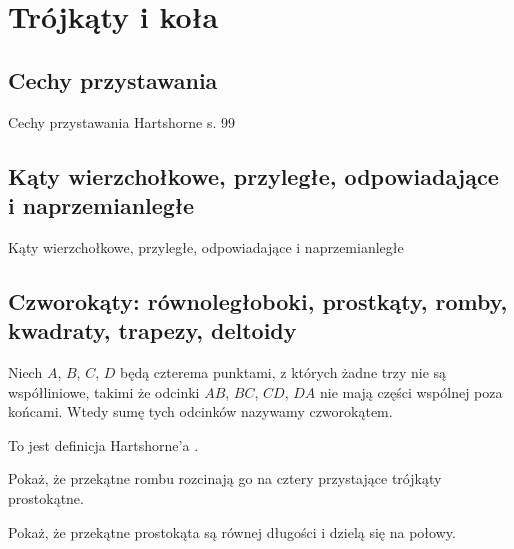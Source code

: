 \section{Trójkąty i koła}
\subsection{Cechy przystawania}
Cechy przystawania
\loremipsum
Hartshorne s. 99

\subsection{Kąty wierzchołkowe, przyległe, odpowiadające i naprzemianległe}
Kąty wierzchołkowe, przyległe, odpowiadające i naprzemianległe
\loremipsum






\subsection{Czworokąty: równoległoboki, prostkąty, romby, kwadraty, trapezy, deltoidy}

\begin{definition}[czworokąt]
    Niech $A$, $B$, $C$, $D$ będą czterema punktami, z których żadne trzy nie są współliniowe, takimi że odcinki $AB$, $BC$, $CD$, $DA$ nie mają części wspólnej poza końcami.
    Wtedy sumę tych odcinków nazywamy czworokątem.
\end{definition}

To jest definicja Hartshorne'a \cite[s. 80]{hartshorne2000}.

Pokaż, że przekątne rombu rozcinają go na cztery przystające trójkąty prostokątne. %

Pokaż, że przekątne prostokąta są równej długości i dzielą się na połowy. %



